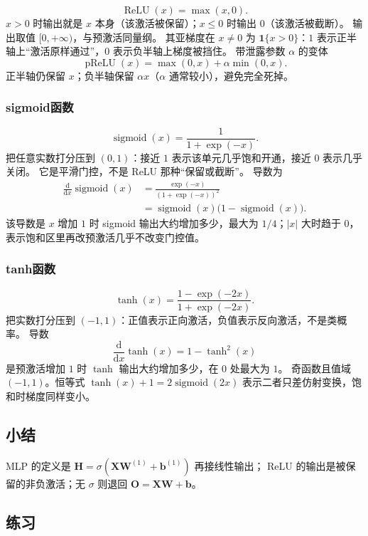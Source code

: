 \[
\operatorname{ReLU}(x)=\max(x,0).
\]
$x>0$ 时输出就是 $x$ 本身（该激活被保留）；$x\le 0$ 时输出 $0$（该激活被截断）。
输出取值 $[0,+\infty)$，与预激活同量纲。
其亚梯度在 $x\neq 0$ 为 $\mathbf{1}\{x>0\}$：$1$ 表示正半轴上“激活原样通过”，$0$ 表示负半轴上梯度被挡住。
带泄露参数 $\alpha$ 的变体
\[
\operatorname{pReLU}(x)=\max(0,x)+\alpha\min(0,x).
\]
正半轴仍保留 $x$；负半轴保留 $\alpha x$（$\alpha$ 通常较小），避免完全死掉。

\subsubsection{sigmoid函数}

\[
\operatorname{sigmoid}(x)=\frac{1}{1+\exp(-x)}.
\]
把任意实数打分压到 $(0,1)$：接近 $1$ 表示该单元几乎饱和开通，接近 $0$ 表示几乎关闭。
它是平滑门控，不是 ReLU 那种“保留或截断”。
导数为
\begin{align*}
\frac{\mathrm{d}}{\mathrm{d}x}\operatorname{sigmoid}(x)
&=
\frac{\exp(-x)}{(1+\exp(-x))^{2}}\\
&=
\operatorname{sigmoid}(x)\bigl(1-\operatorname{sigmoid}(x)\bigr).
\end{align*}
该导数是 $x$ 增加 $1$ 时 sigmoid 输出大约增加多少，最大为 $1/4$；$|x|$ 大时趋于 $0$，
表示饱和区里再改预激活几乎不改变门控值。

\subsubsection{tanh函数}

\[
\operatorname{tanh}(x)=\frac{1-\exp(-2x)}{1+\exp(-2x)}.
\]
把实数打分压到 $(-1,1)$：正值表示正向激活，负值表示反向激活，不是类概率。
导数
\[
\frac{\mathrm{d}}{\mathrm{d}x}\operatorname{tanh}(x)=1-\operatorname{tanh}^{2}(x)
\]
是预激活增加 $1$ 时 $\operatorname{tanh}$ 输出大约增加多少，在 $0$ 处最大为 $1$。
奇函数且值域 $(-1,1)$。恒等式 $\operatorname{tanh}(x)+1=2\operatorname{sigmoid}(2x)$
表示二者只差仿射变换，饱和时梯度同样变小。

\subsection{小结}

MLP 的定义是 $\bm{H}=\sigma(\bm{X}\bm{W}^{(1)}+\bm{b}^{(1)})$ 再接线性输出；
ReLU 的输出是被保留的非负激活；无 $\sigma$ 则退回 $\bm{O}=\bm{X}\bm{W}+\bm{b}$。

\subsection{练习}

